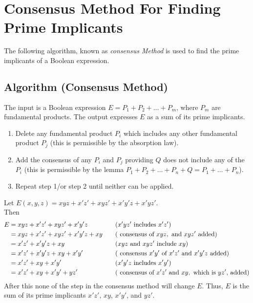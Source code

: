 \documentclass[../main-sheet.tex]{subfiles}
\begin{document}
\section{Consensus Method For Finding Prime Implicants}
The following algorithm, known as \emph{consensus Method} is used to find the prime implicants of a Boolean expression.
\subsection{Algorithm (Consensus Method)}
The input is a Boolean expression $ E=P_1+P_2+\dots+P_m $, where $ P_m $ are fundamental products. The output expresses $ E $ as a sum of its prime implicants.
\begin{enumerate}[label=Step \arabic*.]
    \item Delete any fundamental product $ P_i $ which includes any other fundamental product $ P_j $ (this is permissible by the absorption law).
    \item Add the consensus of any $ P_i $ and $ P_j $ providing $ Q $ does not include any of the $ P_i $ (this is permissible by the lemma $ P_1+P_2+\dots+P_n+Q=P_1+\dots+P_n $).
    \item Repeat step 1/or step 2 until neither can be applied.
\end{enumerate}
\begin{ex}
    Let $ E(x,y,z) = xyz + x' z' + xyz' + x' y' z + x' yz'  $.\\
    Then
    \begin{align*}
        E &= xyz + x'z' + xyz' + x' y' z &\quad&(x' yz' \text{ includes } x' z' )\\
        &= xyz + x'z' + xyz' + x'y'z + xy &\quad&(\text{ consensus of } xyz, \text{ and } xyz' \text{ added} )\\
        &= x' z' + x' y' z + xy &\quad&(xyz \text{ and } xyz' \text{ include } xy)\\
        &= x'z' + x' y' z + xy + x'y'&\quad&(\text{ consensus $ x'y' $ of }  x'z' \text{ and } x' y' z\text{ added})\\
        &= x' z' + xy + x' y' &\quad&(x' y' z \text{ includes } x' y' )\\
        &= x' z' + xy + x' y' + yz' &\quad&(\text{ consensus of } x' z' \text{ and } xy, \text{ which is $ yz' $, added})
    \end{align*}
    After this none of the step in the consensus method will change $ E $. Thus, $ E $ is the sum of its prime implicants $ x' z'  $, $ xy $, $ x'y' $, and $ yz'  $.
\end{ex}
\end{document}
